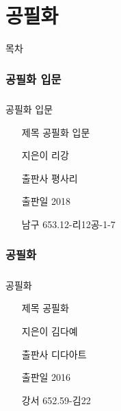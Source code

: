 \documentclass[aspectratio=1610,14pt,xcolor=pdftex,dvipsnames,table,handout]{beamer}
\begin{document}
		\part{ 공필화 }
		\frame{\partpage}
		
		\begin{frame} [plain]{목차}
		\tableofcontents%
		\end{frame}


		\section{ 공필화 입문 }
		\begin{frame} [t,plain]
		\frametitle{}
			\begin{block} { 공필화 입문 }
			\setlength{\leftmargini}{4em}			
			\begin{itemize}
				\item [제목]  	공필화 입문 
				\item [지은이]	리강
				\item [출판사]	평사리 
				\item [출판일]	2018
				\item [남구]		653.12-리12공-1-7 
			\end{itemize}
			\end{block}						
		\end{frame}						


		\section{ 공필화  }
		\begin{frame} [t,plain]
		\frametitle{}
			\begin{block} { 공필화  }
			\setlength{\leftmargini}{4em}			
			\begin{itemize}
				\item [제목]  	공필화  
				\item [지은이]	김다예
				\item [출판사]	디다아트 
				\item [출판일]	2016
				\item [강서] 	652.59-김22	
			\end{itemize}
			\end{block}						
		\end{frame}						
\end{document}
